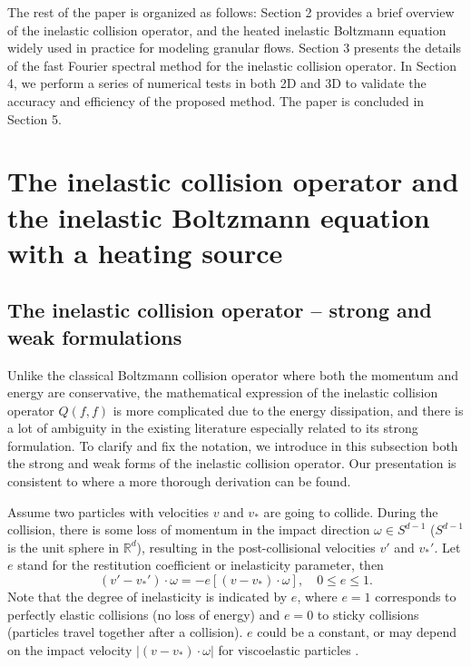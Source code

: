 \documentclass[review,times]{elsarticle}
\begin{document}
The rest of the paper is organized as follows: Section 2 provides a brief overview of the inelastic collision operator, and the heated inelastic Boltzmann equation widely used in practice for modeling granular flows. Section 3 presents the details of the fast Fourier spectral method for the inelastic collision operator. In Section 4, we perform a series of numerical tests in both 2D and 3D to validate the accuracy and efficiency of the proposed method. The paper is concluded in Section 5.

\section{The inelastic collision operator and the inelastic Boltzmann equation with a heating source}

\subsection{The inelastic collision operator -- strong and weak formulations}

Unlike the classical Boltzmann collision operator \cite{Cercignani} where both the momentum and energy are conservative, the mathematical expression of the inelastic collision operator $Q(f,f)$ is more complicated due to the energy dissipation, and there is a lot of ambiguity in the existing literature especially related to its strong formulation. To clarify and fix the notation, we introduce in this subsection both the strong and weak forms of the inelastic collision operator. Our presentation is consistent to \cite{CCC09} where a more thorough derivation can be found.

Assume two particles with velocities $v$ and $v_*$ are going to collide. During the collision, there is some loss of momentum in the impact direction $\omega \in S^{d-1}$ ($S^{d-1}$ is the unit sphere in $\mathbb{R}^d$), resulting in the post-collisional velocities $v'$ and $v_*'$. Let $e$ stand for the restitution coefficient or inelasticity parameter, then
\begin{equation} \label{IO}
(v'-v_*')\cdot \omega=-e[(v-v_*)\cdot \omega], \quad 0 \leq e \leq 1.
\end{equation}
Note that the degree of inelasticity is indicated by $e$, where $e=1$ corresponds to perfectly elastic collisions (no loss of energy) and $e=0$ to sticky collisions (particles travel together after a collision). $e$ could be a constant, or may depend on the impact velocity $|(v-v_*)\cdot \omega|$ for viscoelastic particles \cite{BP}.
\end{document}
